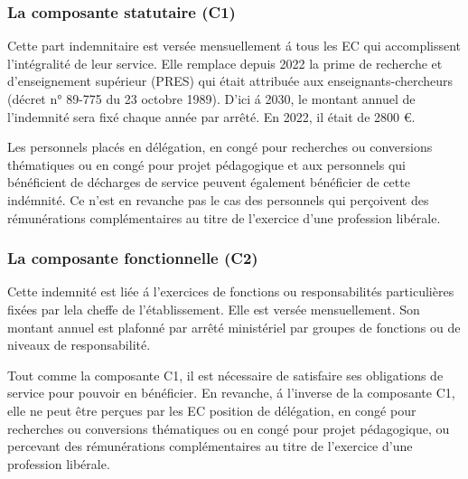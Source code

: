\subsubsection{La composante statutaire (C1)}

Cette part indemnitaire est vers\'ee mensuellement \'a tous les EC qui accomplissent l'int\'egralit\'e de leur service. Elle remplace depuis 2022 la prime de recherche et d'enseignement sup\'erieur (PRES) qui \'etait attribu\'ee aux enseignants-chercheurs (d\'ecret n° 89-775 du 23 octobre 1989). D'ici \'a 2030, le montant annuel de l'indemnit\'e sera fix\'e chaque ann\'ee par arr\^et\'e. En 2022, il \'etait de 2800 \euro.

Les personnels plac\'es en d\'el\'egation, en cong\'e pour recherches ou conversions th\'ematiques ou en cong\'e pour projet p\'edagogique et aux personnels qui b\'en\'eficient de d\'echarges de service peuvent \'egalement b\'en\'eficier de cette ind\'emnit\'e. Ce n'est en revanche pas le cas des personnels qui perçoivent des r\'emun\'erations compl\'ementaires au titre de l'exercice d'une profession lib\'erale.

%

\subsubsection{La composante fonctionnelle (C2)}

Cette indemnit\'e est li\'ee \'a l'exercices de fonctions ou responsabilit\'es particuli\`eres fix\'ees par le\mp la chef\mp fe de l'\'etablissement. Elle est vers\'ee mensuellement. Son montant annuel est plafonn\'e par arr\^et\'e minist\'eriel par groupes de fonctions ou de niveaux de responsabilit\'e. 

Tout comme la composante C1, il est n\'ecessaire de satisfaire ses obligations de service pour pouvoir en b\'en\'eficier. En revanche, \'a l'inverse de la composante C1, elle ne peut \^etre per\c{c}ues par les EC position de d\'el\'egation, en cong\'e pour recherches ou conversions th\'ematiques ou en cong\'e pour projet p\'edagogique, ou percevant des r\'emun\'erations compl\'ementaires au titre de l'exercice d'une profession lib\'erale.


